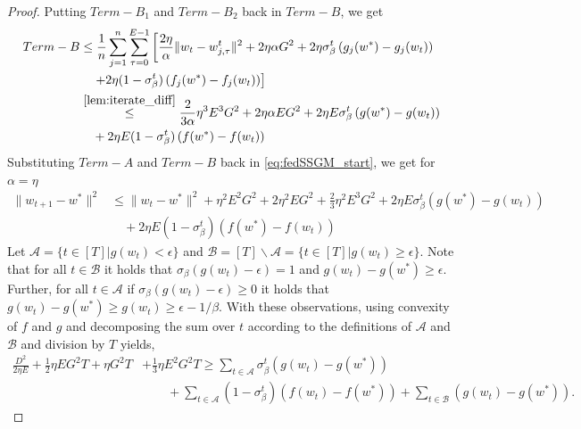 \documentclass{article} %
\def\A{{\mathcal A}}
\def\B{{\mathcal B}}
\begin{document}
\begin{proof}
Putting $Term-B_1$ and $Term-B_2$ back in $Term-B$, we get
\begin{equation*}
    \begin{aligned}
        Term-B &\leq \frac{1}{n} \sum_{j=1}^n \sum_{\tau=0}^{E-1} \left[\frac{2\eta}{\alpha} \| w_t - w_{j,\tau}^t \|^2 + 2\eta \alpha G^2 + 2\eta \sigma_{\beta}^t \left( g_j(w^*) - g_j(w_t) \right) \right.
        \\
        &\quad \left. + 2\eta (1 - \sigma_{\beta}^t) \left( f_j(w^*) - f_j(w_t) \right)\right]
        \\
        & \overset{\Cref{lem:iterate_diff}}{\leq} \frac{2}{3\alpha} \eta^3E^3G^2 + 2\eta \alpha E G^2 + 2\eta E \sigma_{\beta}^t \left( g(w^*) - g(w_t) \right) 
        \\
        &\quad + 2\eta E (1 - \sigma_{\beta}^t) \left( f(w^*) - f(w_t) \right)
    \end{aligned}
\end{equation*}
Substituting $Term-A$ and $Term-B$ back in \cref{eq:fedSSGM_start}, we get for $\alpha = \eta$
\begin{equation*}
    \begin{aligned}
        \| w_{t+1} - w^* \|^2 &\leq \| w_t - w^* \|^2  + \eta^2 E^2 G^2 + 2\eta^2 E G^2 
        + \frac{2}{3}\eta^2E^3G^2 + 2\eta E \sigma_{\beta}^t \left( g(w^*) - g(w_t) \right) 
        \\
        &\quad+ 2\eta E (1 - \sigma_{\beta}^t) \left( f(w^*) - f(w_t) \right)
    \end{aligned}
\end{equation*}
Let $\A = \{t\in [T]| g(w_t)< \epsilon\}$ and $\B = [T]\backslash \A = \{t\in [T]| g(w_t)\geq \epsilon\}$. Note that for all $t\in \B$ it holds that $\sigma_\beta(g(w_t)-\epsilon) = 1$ and $g(w_t)-g(w^\ast)\geq \epsilon$. Further, for all $t\in \A$ if $\sigma_\beta(g(w_t)-\epsilon) \geq 0$ it holds that $g(w_t)-g(w^\ast)\geq g(w_t)\geq\epsilon -1/\beta$. With these observations, using convexity of $f$ and $g$ and decomposing the sum over $t$ according to the definitions of $\A$ and $\B$ and division by $T$ yields,
\begin{equation*}
    \begin{aligned}
       \frac{D^2}{2\eta E} + \frac{1}{2}\eta E G^2 T + \eta G^2 T &+ \frac{1}{3}\eta E^2 G^2 T \geq \sum_{t\in \A} \sigma_\beta^t \left(g(w_t) - g(w^*) \right) 
       \\ 
       &\qquad + \sum_{t\in \A} (1 - \sigma_{\beta}^t)\left(f(w_t) - f(w^*)  \right) +\sum_{t\in \B} \left(g(w_t) - g(w^*) \right). 

\end{aligned}
\end{equation*}
\end{proof}
\end{document}
